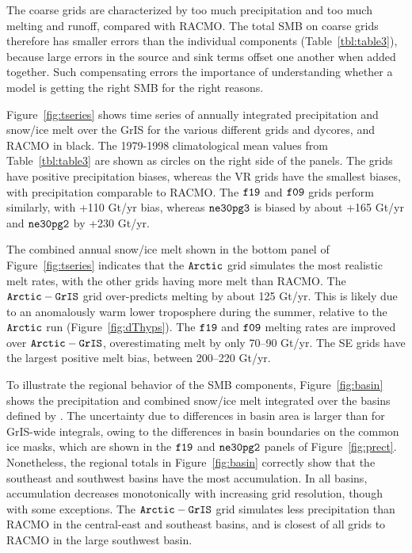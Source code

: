 \documentclass[draft]{agujournal2019}
\begin{document}
The coarse grids are characterized by too much precipitation and too much melting and runoff, compared with RACMO. The total SMB on coarse grids therefore has smaller errors than the individual components (Table~\ref{tbl:table3}), because large errors in the source and sink terms offset one another when added together. Such compensating errors {\color{blue}{underscore}} the importance of understanding whether a model is getting the right SMB for the right reasons.

Figure~\ref{fig:tseries} shows time series of annually integrated precipitation and snow/ice melt over the GrIS for the various different grids and dycores, and RACMO in black. The 1979-1998 climatological mean values from Table~\ref{tbl:table3} are shown as circles on the right side of the panels. The {} grids have positive precipitation biases, whereas the VR grids have the smallest biases, with precipitation comparable to RACMO. The $\tt f19$ and $\tt f09$ grids perform similarly, with +110 Gt/yr bias, whereas $\tt ne30pg3$ is biased by about +165 Gt/yr and $\tt ne30pg2$ by +230 Gt/yr.

The combined annual snow/ice melt shown in the bottom panel of Figure~\ref{fig:tseries} indicates that the $\tt Arctic$ grid simulates the most realistic melt rates, with the other grids having more melt than RACMO. The $\tt Arctic-GrIS$ grid over-predicts melting by about 125 Gt/yr. This is likely due to an anomalously warm lower troposphere during the summer, relative to the $\tt Arctic$ run (Figure~\ref{fig:dThyps}). The $\tt f19$ and $\tt f09$ melting rates are improved over $\tt Arctic-GrIS$, overestimating melt by only 70--90 Gt/yr. The SE grids have the largest positive melt bias, between 200--220 Gt/yr.

To illustrate the regional behavior of the SMB components, Figure~\ref{fig:basin} shows the precipitation and combined snow/ice melt integrated over the basins defined by . The uncertainty due to differences in basin area is larger than for GrIS-wide integrals, owing to the differences in basin boundaries on the common ice masks, which are shown in the $\tt f19$ and $\tt ne30pg2$ panels of Figure~\ref{fig:prect}. Nonetheless, the regional totals in Figure~\ref{fig:basin} correctly show that the southeast and southwest basins have the most accumulation. In all basins, accumulation decreases monotonically with increasing grid resolution, though with some exceptions. The $\tt Arctic-GrIS$ grid simulates less precipitation than RACMO in the central-east and southeast basins, and is closest of all grids to RACMO in the large southwest basin.
\end{document}
